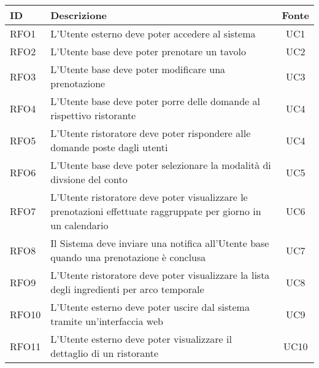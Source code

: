 \begin{table}[H]
	\renewcommand{\arraystretch}{1.5}
	\centering
	\begin{tabularx}{\textwidth}{l|X|c}
		\textbf{ID} & \textbf{Descrizione}                                                                                                      & \textbf{Fonte} \\
		\hline
		RFO1        & L'Utente esterno deve poter accedere al sistema                                                                           & UC1            \\
		\hline
		RFO2        & L'Utente base deve poter prenotare un tavolo                                                                              & UC2            \\
		\hline
		RFO3        & L'Utente base deve poter modificare una prenotazione                                                                      & UC3            \\
		\hline
		RFO4        & L'Utente base deve poter porre delle domande al rispettivo ristorante                                                     & UC4            \\
		\hline
		RFO5        & L'Utente ristoratore deve poter rispondere alle domande poste dagli utenti                                                & UC4            \\
		\hline
		RFO6        & L'Utente base deve poter selezionare la modalità di divsione del conto                                                    & UC5            \\
		\hline
		RFO7        & L'Utente ristoratore deve poter visualizzare le prenotazioni effettuate raggruppate per giorno in un calendario           & UC6            \\
		\hline
		RFO8        & Il Sistema deve inviare una notifica all'Utente base quando una prenotazione è conclusa                                   & UC7            \\
		\hline
		RFO9        & L'Utente ristoratore deve poter visualizzare la lista degli ingredienti per arco temporale                                & UC8            \\
		\hline
		RFO10       & L'Utente esterno deve poter uscire dal sistema tramite un'interfaccia web                                                 & UC9            \\
		\hline
		RFO11       & L'Utente esterno deve poter visualizzare il dettaglio di un ristorante                                                    & UC10           \\

\end{tabularx}
\end{table}
